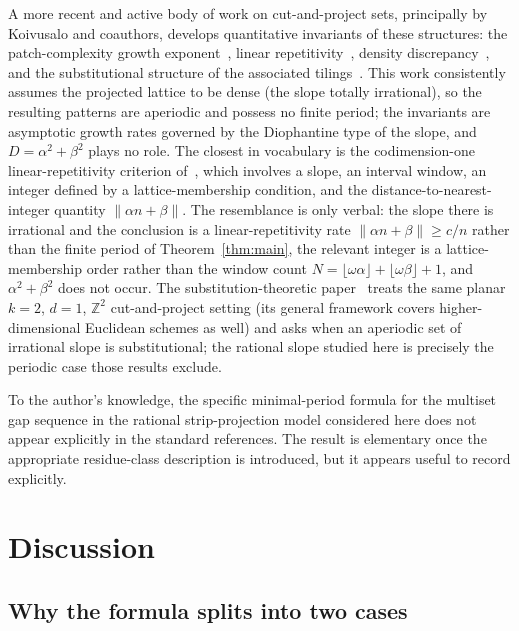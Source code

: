 \documentclass[11pt,reqno]{amsart}
\theoremstyle{plain}
\theoremstyle{definition}
\theoremstyle{remark}
\begin{document}
A more recent and active body of work on cut-and-project sets, principally by
Koivusalo and coauthors, develops quantitative invariants of these structures:
the patch-complexity growth exponent~\cite{KoivusaloWalton2021}, linear
repetitivity~\cite{KoivusaloWalton2020}, density
discrepancy~\cite{KoivusaloLagace2024}, and the substitutional structure of the
associated tilings~\cite{HarrissKoivusaloWalton2025}.  This work consistently
assumes the projected lattice to be dense (the slope totally irrational), so the
resulting patterns are aperiodic and possess no finite period; the invariants are
asymptotic growth rates governed by the Diophantine type of the slope, and
\(D = \alpha^2+\beta^2\) plays no role.  The closest in vocabulary is the
codimension-one linear-repetitivity criterion of~\cite{KoivusaloWalton2020}, which
involves a slope, an interval window, an integer defined by a lattice-membership
condition, and the distance-to-nearest-integer quantity
\(\lVert\alpha n+\beta\rVert\).  The resemblance is only verbal: the slope there is
irrational and the conclusion is a linear-repetitivity rate
\(\lVert\alpha n+\beta\rVert \ge c/n\) rather than the finite period of
Theorem~\ref{thm:main}, the relevant integer is a lattice-membership order rather
than the window count
\(N = \lfloor\omega\alpha\rfloor + \lfloor\omega\beta\rfloor + 1\), and
\(\alpha^2+\beta^2\) does not occur.  The substitution-theoretic
paper~\cite{HarrissKoivusaloWalton2025} treats the same planar \(k=2\), \(d=1\),
\(\mathbb{Z}^2\) cut-and-project setting (its general framework covers
higher-dimensional Euclidean schemes as well) and asks when an aperiodic set of
irrational slope is substitutional; the rational slope studied here is precisely the
periodic case those results exclude.

To the author's knowledge, the specific minimal-period formula for
the multiset gap sequence in the rational strip-projection model
considered here does not appear explicitly in the standard
references.  The result is elementary once the appropriate
residue-class description is introduced, but it appears useful to
record explicitly.

\section{Discussion}\label{sec:discussion}

\subsection{Why the formula splits into two cases}
\end{document}

